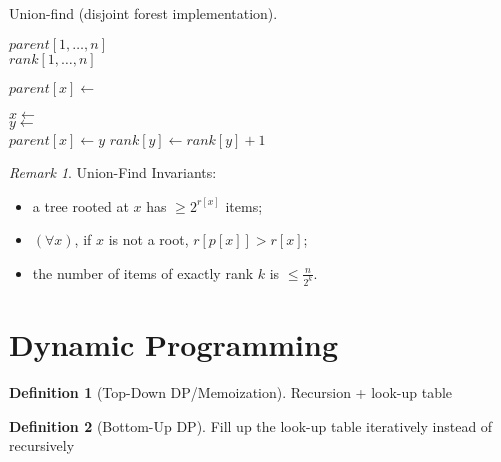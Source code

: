 \documentclass[11pt]{article}
\theoremstyle{definition}
\newtheorem{definition}{Definition}[section]
\theoremstyle{remark}
\newtheorem*{remark}{Remark}
\begin{document}
\begin{algorithm}
    \caption{Union-find (disjoint forest implementation).}
    
    \DontPrintSemicolon
    
    
    $parent[1,\dots,n]$\\
    $rank[1,\dots,n]$     
    
     {
	 {
	}
	$parent[x] \gets$  
    }
    
     {
    	$x\gets$  \\
    	$y\gets$  \\
    	 {
    		\Return {}
    	}
    	$parent[x] \gets y$
    	 {
			$rank[y] \gets rank[y] + 1$    	
    	}
    }
\end{algorithm}
\begin{remark}
Union-Find Invariants:
\begin{itemize}
\item a tree rooted at $x$ has $\geq 2^{r[x]}$ items;
\item $(\forall x)$, if $x$ is not a root, $r[p[x]] > r[x]$;
\item the number of items of exactly rank $k$ is $\leq \frac{n}{2^k}$.
\end{itemize}
\end{remark}

\section{Dynamic Programming}
\begin{definition}[Top-Down DP/Memoization]
Recursion + look-up table
\end{definition}

\begin{definition}[Bottom-Up DP]
Fill up the look-up table iteratively instead of recursively
\end{definition}
\end{document}
